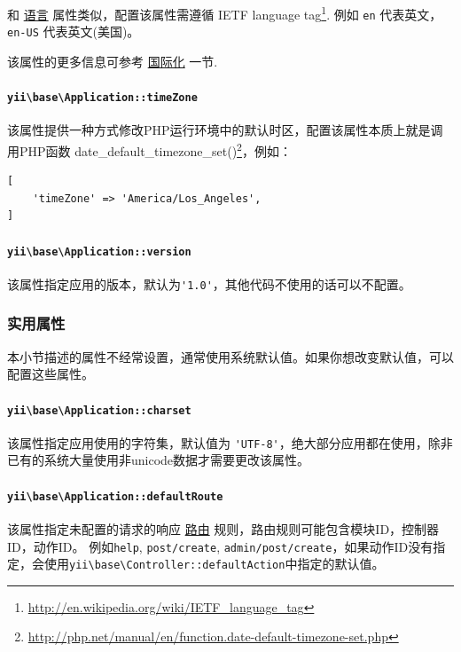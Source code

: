 和 \hyperref[structure-applications.md::::language]{语言} 属性类似，配置该属性需遵循 IETF language tag\footnote{\url{http://en.wikipedia.org/wiki/IETF\_language\_tag}}.
例如 \lstinline|en| 代表英文， \lstinline|en-US| 代表英文(美国)。

该属性的更多信息可参考 \hyperref[tutorial-i18n.md]{国际化} 一节.

\paragraph{\texttt{yii{\allowbreak{}\textbackslash}base{\allowbreak{}\textbackslash}Application\allowbreak{}::\allowbreak{}timeZone} \label{structure-applications.md::timeZone}}
该属性提供一种方式修改PHP运行环境中的默认时区，配置该属性本质上就是调用PHP函数
date\_default\_timezone\_set()\footnote{\url{http://php.net/manual/en/function.date-default-timezone-set.php}}，例如：

\lstset{language=php}\begin{lstlisting}
[
    'timeZone' => 'America/Los_Angeles',
]
\end{lstlisting}
\paragraph{\texttt{yii{\allowbreak{}\textbackslash}base{\allowbreak{}\textbackslash}Application\allowbreak{}::\allowbreak{}version} \label{structure-applications.md::version}}
该属性指定应用的版本，默认为\lstinline|'1.0'|，其他代码不使用的话可以不配置。

\subsubsection{实用属性 \label{structure-applications.md::useful-properties}}
本小节描述的属性不经常设置，通常使用系统默认值。如果你想改变默认值，可以配置这些属性。

\paragraph{\texttt{yii{\allowbreak{}\textbackslash}base{\allowbreak{}\textbackslash}Application\allowbreak{}::\allowbreak{}charset} \label{structure-applications.md::charset}}
该属性指定应用使用的字符集，默认值为 \lstinline|'UTF-8'|，绝大部分应用都在使用，除非已有的系统大量使用非unicode数据才需要更改该属性。

\paragraph{\texttt{yii{\allowbreak{}\textbackslash}base{\allowbreak{}\textbackslash}Application\allowbreak{}::\allowbreak{}defaultRoute} \label{structure-applications.md::defaultRoute}}
该属性指定未配置的请求的响应 \hyperref[runtime-routing.md]{路由} 规则，路由规则可能包含模块ID，控制器ID，动作ID。
例如\lstinline|help|, \lstinline|post/create|, \lstinline|admin/post/create|，如果动作ID没有指定，会使用\texttt{yii{\allowbreak{}\textbackslash}base{\allowbreak{}\textbackslash}Controller\allowbreak{}::\allowbreak{}defaultAction}中指定的默认值。

